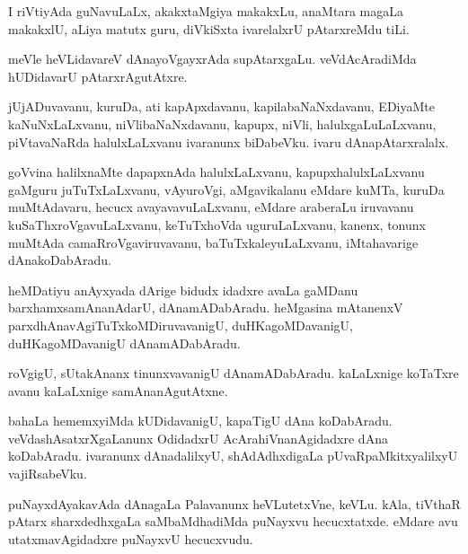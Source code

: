 \documentclass{article}
\begin{document}
\begin{mn}
I riVtiyAda guNavuLaLx, akakxtaMgiya makakxLu,  anaMtara magaLa makakxlU,  
aLiya matutx guru, diVkiSxta ivarelalxrU pAtarxreMdu tiLi.
\end{mn}

\begin{mn}
meVle heVLidavareV dAnayoVgayxrAda supAtarxgaLu.  veVdAcAradiMda hUDidavarU pAtarxrAgutAtxre.
\end{mn}

\begin{mn}
jUjADuvavanu,  kuruDa,  ati kapApxdavanu,  kapilabaNaNxdavanu, EDiyaMte kaNuNxLaLxvanu, 
niVlibaNaNxdavanu, kapupx, niVli, halulxgaLuLaLxvanu, piVtavaNaRda halulxLaLxvanu 
ivaranunx biDabeVku.  ivaru dAnapAtarxralalx.
\end{mn}

\begin{mn}
goVvina halilxnaMte dapapxnAda halulxLaLxvanu,  kapupxhalulxLaLxvanu gaMguru 
juTuTxLaLxvanu, vAyuroVgi, aMgavikalanu eMdare kuMTa, kuruDa muMtAdavaru,  
hecucx avayavavuLaLxvanu,  eMdare araberaLu  iruvavanu  kuSaThxroVgavuLaLxvanu, 
keTuTxhoVda uguruLaLxvanu,  kanenx, tonunx muMtAda camaRroVgaviruvavanu,  
baTuTxkaleyuLaLxvanu,  iMtahavarige  dAnakoDabAradu.
\end{mn}

\begin{mn}
heMDatiyu anAyxyada dArige bidudx idadxre avaLa gaMDanu barxhamxsamAnanAdarU,  
dAnamADabAradu.  heMgasina  mAtanenxV  parxdhAnavAgiTuTxkoMDiruvavanigU,  
duHKagoMDavanigU, duHKagoMDavanigU dAnamADabAradu.
\end{mn}

\begin{mn}
roVgigU,  sUtakAnanx tinunxvavanigU  dAnamADabAradu. kaLaLxnige koTaTxre avanu 
kaLaLxnige samAnanAgutAtxne.
\end{mn}

\begin{mn}
bahaLa hememxyiMda kUDidavanigU,  kapaTigU  dAna koDabAradu.  veVdashAsatxrXgaLanunx  
OdidadxrU AcArahiVnanAgidadxre dAna koDabAradu.  ivaranunx dAnadalilxyU,  
shAdAdhxdigaLa  pUvaRpaMkitxyalilxyU vajiRsabeVku.
\end{mn}

\begin{mn}
puNayxdAyakavAda dAnagaLa Palavanunx heVLutetxVne, keVLu.  kAla, tiVthaR pAtarx sharxdedhxgaLa  
saMbaMdhadiMda puNayxvu hecucxtatxde.  eMdare avu utatxmavAgidadxre puNayxvU hecucxvudu.
\end{mn}
\end{document}

